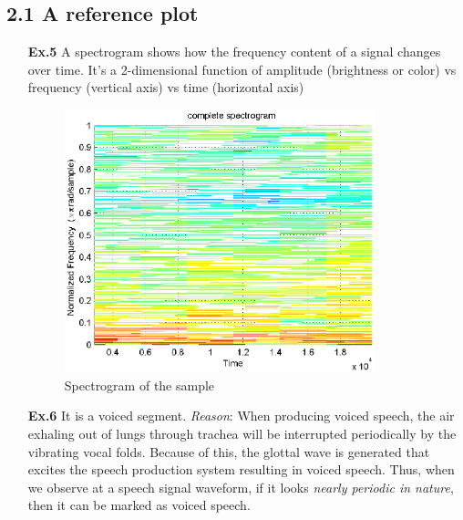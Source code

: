 \documentclass[a4paper]{article}
\begin{document}
\subsection*{2.1 A reference plot}
\begin{enumerate}
\item[\textbf{Ex.5}] A spectrogram shows how the frequency content of a signal changes over time. It's a 2-dimensional function of amplitude (brightness or color) vs frequency (vertical axis) vs time (horizontal axis)

\begin{figure}[H]
	\begin{center}
		\includegraphics[width=0.85\textwidth]{ex5.eps}
		\caption{Spectrogram of the sample}\label{fig:spectro}		
	\end{center}
\end{figure}


\item[\textbf{Ex.6}] It is a voiced segment. \newline
\textit{Reason}: When producing voiced speech, the air exhaling out of lungs through trachea will be interrupted periodically by the vibrating vocal folds. Because of this, the glottal wave is generated that excites the speech production system resulting in voiced speech. Thus, when we observe at a speech signal waveform, if it looks \textit{nearly periodic in nature}, then it can be marked as voiced speech.


\end{enumerate}
\end{document}
